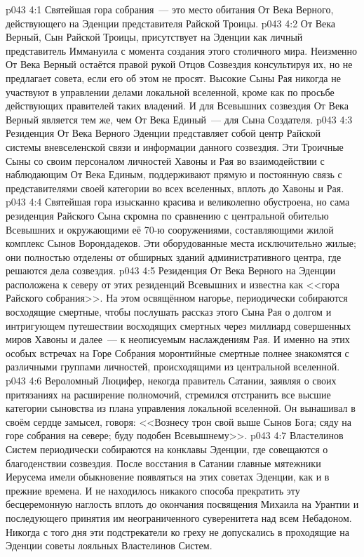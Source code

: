 \vs p043 4:1 Святейшая гора собрания~--- это место обитания От Века Верного, действующего на Эденции представителя Райской Троицы.
\vs p043 4:2 От Века Верный, Сын Райской Троицы, присутствует на Эденции как личный представитель Иммануила с момента создания этого столичного мира. Неизменно От Века Верный остаётся правой рукой Отцов Созвездия консультируя их, но не предлагает совета, если его об этом не просят. Высокие Сыны Рая никогда не участвуют в управлении делами локальной вселенной, кроме как по просьбе действующих правителей таких владений. И для Всевышних созвездия От Века Верный является тем же, чем От Века Единый~--- для Сына Создателя.
\vs p043 4:3 Резиденция От Века Верного Эденции представляет собой центр Райской системы вневселенской связи и информации данного созвездия. Эти Троичные Сыны со своим персоналом личностей Хавоны и Рая во взаимодействии с наблюдающим От Века Единым, поддерживают прямую и постоянную связь с представителями своей категории во всех вселенных, вплоть до Хавоны и Рая.
\vs p043 4:4 Святейшая гора изысканно красива и великолепно обустроена, но сама резиденция Райского Сына скромна по сравнению с центральной обителью Всевышних и окружающими её 70-ю сооружениями, составляющими жилой комплекс Сынов Ворондадеков. Эти оборудованные места исключительно жилые; они полностью отделены от обширных зданий административного центра, где решаются дела созвездия.
\vs p043 4:5 Резиденция От Века Верного на Эденции расположена к северу от этих резиденций Всевышних и известна как <<гора Райского собрания>>. На этом освящённом нагорье, периодически собираются восходящие смертные, чтобы послушать рассказ этого Сына Рая о долгом и интригующем путешествии восходящих смертных через миллиард совершенных миров Хавоны и далее~--- к неописуемым наслаждениям Рая. И именно на этих особых встречах на Горе Собрания моронтийные смертные полнее знакомятся с различными группами личностей, происходящими из центральной вселенной.
\vs p043 4:6 Вероломный Люцифер, некогда правитель Сатании, заявляя о своих притязаниях на расширение полномочий, стремился отстранить все высшие категории сыновства из плана управления локальной вселенной. Он вынашивал в своём сердце замысел, говоря: <<Вознесу трон свой выше Сынов Бога; сяду на горе собрания на севере; буду подобен Всевышнему>>.
\vs p043 4:7  Властелинов Систем периодически собираются на конклавы Эденции, где совещаются о благоденствии созвездия. После восстания в Сатании главные мятежники Иерусема имели обыкновение появляться на этих советах Эденции, как и в прежние времена. И не находилось никакого способа прекратить эту бесцеремонную наглость вплоть до окончания посвящения Михаила на Урантии и последующего принятия им неограниченного суверенитета над всем Небадоном. Никогда с того дня эти подстрекатели ко греху не допускались в проходящие на Эденции советы лояльных Властелинов Систем.

